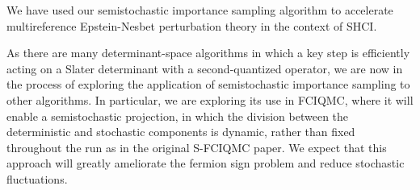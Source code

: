 \documentclass[english]{article}
\begin{document}
We have used our semistochastic importance sampling algorithm to accelerate multireference Epstein-Nesbet perturbation theory in the context of SHCI.

As there are many determinant-space algorithms in which a key step is efficiently acting on a Slater determinant with a second-quantized operator, we are now in the process of exploring the application of semistochastic importance sampling to other algorithms. In particular, we are exploring its use in FCIQMC, where it will enable a semistochastic projection, in which the division between the deterministic and stochastic components is dynamic, rather than fixed throughout the run as in the original S-FCIQMC paper. We expect that this approach will greatly ameliorate the fermion sign problem and reduce stochastic fluctuations.
\end{document}
